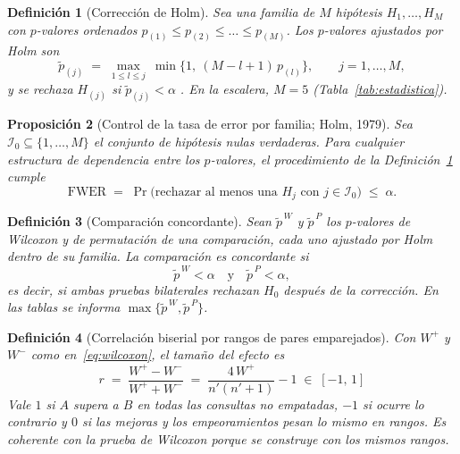 \documentclass[11pt,letterpaper]{article}
\newtheorem{definition}{Definición}[section]
\newtheorem{proposition}[definition]{Proposición}
\numberwithin{equation}{section}
\begin{document}
\begin{definition}[Corrección de Holm]
\label{def:holm}
Sea una familia de $M$ hipótesis $H_1,\dots,H_M$ con $p$-valores ordenados $p_{(1)}\leq p_{(2)}\leq\dots\leq p_{(M)}$. Los $p$-valores ajustados por Holm son
\begin{equation}
\tilde p_{(j)} \;=\; \max_{1\leq l\leq j}\ \min\!\big\{1,\ (M-l+1)\,p_{(l)}\big\}, \qquad j=1,\dots,M,
\label{eq:holm}
\end{equation}
y se rechaza $H_{(j)}$ si $\tilde p_{(j)}<\alpha$ \cite{holm1979}. En la escalera, $M=5$ (Tabla~\ref{tab:estadistica}).
\end{definition}

\begin{proposition}[Control de la tasa de error por familia; Holm, 1979]
\label{prop:holm}
Sea $\mathcal{I}_0\subseteq\{1,\dots,M\}$ el conjunto de hipótesis nulas verdaderas. Para cualquier estructura de dependencia entre los $p$-valores, el procedimiento de la Definición~\ref{def:holm} cumple
\begin{equation}
\mathrm{FWER} \;=\; \Pr\big(\text{rechazar al menos una } H_j \text{ con } j\in\mathcal{I}_0\big) \;\leq\; \alpha .
\label{eq:fwer}
\end{equation}
\end{proposition}

\begin{definition}[Comparación concordante]
\label{def:concordante}
Sean $\tilde p^{\,W}$ y $\tilde p^{\,P}$ los $p$-valores de Wilcoxon y de permutación de una comparación, cada uno ajustado por Holm dentro de su familia. La comparación es \emph{concordante} si
\begin{equation}
\tilde p^{\,W}<\alpha \quad\text{y}\quad \tilde p^{\,P}<\alpha ,
\label{eq:concordante}
\end{equation}
es decir, si ambas pruebas bilaterales rechazan $H_0$ después de la corrección. En las tablas se informa $\max\{\tilde p^{\,W},\tilde p^{\,P}\}$.
\end{definition}

\begin{definition}[Correlación biserial por rangos de pares emparejados]
\label{def:biserial}
Con $W^{+}$ y $W^{-}$ como en~\eqref{eq:wilcoxon}, el tamaño del efecto \cite{kerby2014} es
\begin{equation}
r \;=\; \frac{W^{+}-W^{-}}{W^{+}+W^{-}} \;=\; \frac{4\,W^{+}}{n'(n'+1)}-1 \;\in\; [-1,\,1]
\label{eq:biserial}
\end{equation}
Vale $1$ si $A$ supera a $B$ en todas las consultas no empatadas, $-1$ si ocurre lo contrario y $0$ si las mejoras y los empeoramientos pesan lo mismo en rangos. Es coherente con la prueba de Wilcoxon porque se construye con los mismos rangos.
\end{definition}
\end{document}
